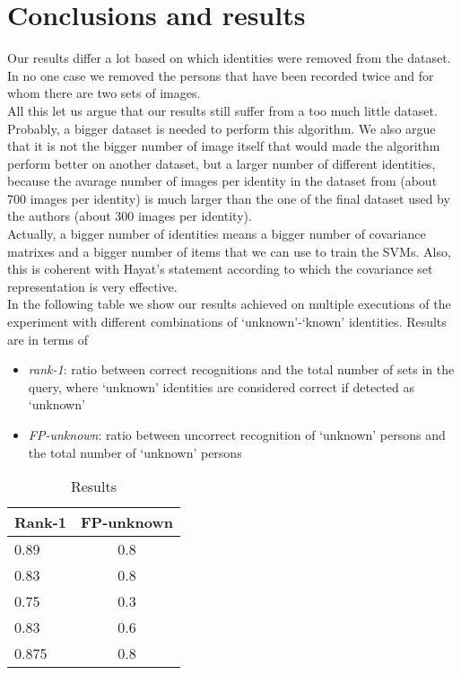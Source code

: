 \documentclass{article}
\begin{document}
\section{Conclusions and results}
Our results differ a lot based on which identities were removed from the dataset.
In no one case we removed the persons that have been recorded twice and for whom
there are two sets of images.
\\
All this let us argue that our results still suffer from a too much little
dataset. Probably, a bigger dataset is needed to perform this algorithm. We
also argue that it is not the bigger number of image itself that would made the
algorithm perform better on another dataset, but a larger number of different
identities, because the avarage number of images per identity in the dataset from
\citep{Fanelli2013} (about 700 images per identity) is much larger than the
one of the final dataset used by the authors (about 300 images per identity).
\\
Actually, a bigger number of identities means a bigger number of covariance
matrixes and a bigger number of items that we can use to train the SVMs. Also,
this is coherent with Hayat's statement according to which the covariance set
representation is very effective.
\\
In the following table we show our results achieved on multiple executions of
the experiment with different combinations of `unknown'-`known' identities.
Results are in terms of
\begin{itemize}
	\item \textit{rank-1}: ratio between correct recognitions and the
		total number of sets in the query, where `unknown'
		identities are considered correct if detected as `unknown'
	\item \textit{FP-unknown}: ratio between uncorrect recognition of
		`unknown' persons and the total number of `unknown' persons
\end{itemize}
\begin{table}[]
	\centering
	\caption{Results}
	\label{tab:results}
	\begin{tabular}{|l|c|}
		\hline
		\bf Rank-1 & \bf FP-unknown \\ \hline
		0.89	   & 0.8 \\ \hline
		0.83	   & 0.8 \\ \hline
		0.75	   & 0.3 \\ \hline
		0.83	   & 0.6 \\ \hline
		0.875      & 0.8 \\ \hline
	\end{tabular}
\end{table}
\end{document}
